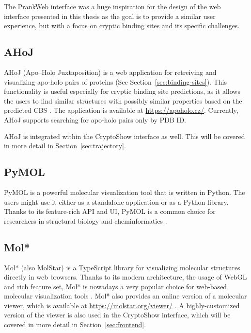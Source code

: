 The PrankWeb interface was a huge inspiration for the design of the web interface presented in this thesis as the goal is to provide a similar user experience, but with a focus on cryptic binding sites and its specific challenges.

\subsection{AHoJ}
\label{sec:ahoj}

AHoJ (Apo–Holo Juxtaposition) is a web application for retreiving and visualizing apo-holo pairs of proteins (See Section~\ref{sec:binding-sites}). This functionality is useful especially for cryptic binding site predictions, as it allows the users to find similar structures with possibly similar properties based on the predicted CBS \cite{feidakis2022ahoj}. The application is available at \url{https://apoholo.cz/}. Currently, AHoJ supports searching for apo-holo pairs only by PDB ID.

AHoJ is integrated within the CryptoShow interface as well. This will be covered in more detail in Section~\ref{sec:trajectory}.

\subsection{PyMOL}
\label{sec:pymol}

PyMOL is a powerful molecular visualization tool that is written in Python. The users might use it either as a standalone application or as a Python library. Thanks to its feature-rich API and UI, PyMOL is a common choice for researchers in structural biology and cheminformatics \cite{delano2002pymol}.

\subsection{Mol*}
\label{sec:molstar}

Mol* (also MolStar) is a TypeScript library for visualizing molecular structures directly in web browsers. Thanks to its modern architecture, the usage of WebGL and rich feature set, Mol* is nowadays a very popular choice for web-based molecular visualization tools \cite{sehnal2018mol}. Mol* also provides an online version of a molecular viewer, which is available at \url{https://molstar.org/viewer/} \cite{sehnal2021mol}. A highly-customized version of the viewer is also used in the CryptoShow interface, which will be covered in more detail in Section~\ref{sec:frontend}.

